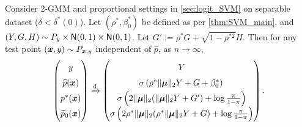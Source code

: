 \begin{lem}\label{lem:conf_limit}
    Consider 2-GMM and proportional settings in \cref{sec:logit_SVM} on separable dataset ($\delta < \delta^*(0)$). Let $(\rho^*, \beta_0^*)$ be defined as per \cref{thm:SVM_main}, and $(Y, G, H) \sim P_y \times {\sf N}(0,1) \times {\sf N}(0,1)$. Let $G' := \rho^* G + \sqrt{1 - \rho^{*2}} H$. Then for any test point $(\text{\boldmath $x$}, y) \sim P_{\text{\boldmath $x$}, y}$ independent of $\hat p$, as $n \to \infty$,
    \begin{equation}
    \label{eq:p(x)_asymp}
        \begin{pmatrix}
        y 
        \vphantom{\left( \log\frac{\pi}{1 - \pi} \right)} 
        \\
        \hat p(\xx)
        \vphantom{\left( \log\frac{\pi}{1 - \pi} \right)}
        \\
        p^*(\xx) 
        \vphantom{\left( \log\frac{\pi}{1 - \pi} \right)}
        \\
        \hat p_0(\xx)
        \vphantom{\left( \log\frac{\pi}{1 - \pi} \right)}
        \end{pmatrix}
        \cond
        \begin{pmatrix}
            Y 
            \vphantom{\left( \log\frac{\pi}{1 - \pi} \right)} 
            \\
            \sigma\left( \rho^*\|\vmu\|_2 Y + G + \beta_0^* \right) 
            \vphantom{\left( \log\frac{\pi}{1 - \pi} \right)} 
            \\
            \sigma \left( 2 \|\bmu\|_2 (\|\bmu\|_2 Y + G') + \log\frac{\pi}{1 - \pi} \right) \\
            \sigma \left( 2 \rho^* \|\bmu\|_2 (\rho^* \|\bmu\|_2 Y + G) + \log\frac{\pi}{1 - \pi} \right)
        \end{pmatrix}.
    \end{equation}
\end{lem}
